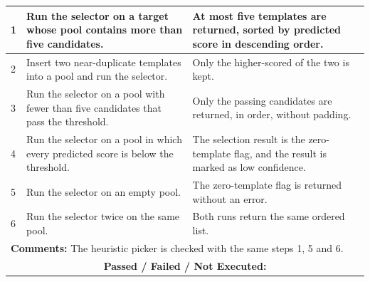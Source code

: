 \documentclass{FastFyp}
\begin{document}
{\begin{longtable}{|p{2.4cm}|p{4.6cm}|p{2.4cm}|p{3.8cm}|}
1 & Run the selector on a target whose pool contains more than five candidates. & \multicolumn{2}{p{6.64cm}|}{At most five templates are returned, sorted by predicted score in descending order.} \\ \hline
2 & Insert two near-duplicate templates into a pool and run the selector. & \multicolumn{2}{p{6.64cm}|}{Only the higher-scored of the two is kept.} \\ \hline
3 & Run the selector on a pool with fewer than five candidates that pass the threshold. & \multicolumn{2}{p{6.64cm}|}{Only the passing candidates are returned, in order, without padding.} \\ \hline
4 & Run the selector on a pool in which every predicted score is below the threshold. & \multicolumn{2}{p{6.64cm}|}{The selection result is the zero-template flag, and the result is marked as low confidence.} \\ \hline
5 & Run the selector on an empty pool. & \multicolumn{2}{p{6.64cm}|}{The zero-template flag is returned without an error.} \\ \hline
6 & Run the selector twice on the same pool. & \multicolumn{2}{p{6.64cm}|}{Both runs return the same ordered list.} \\ \hline
\multicolumn{4}{|p{14.51cm}|}{\textbf{Comments:} The heuristic picker is checked with the same steps 1, 5 and 6.} \\ \hline
\multicolumn{4}{|c|}{\textbf{Passed / Failed / Not Executed:}} \\ \hline
\end{longtable}
}
\end{document}
